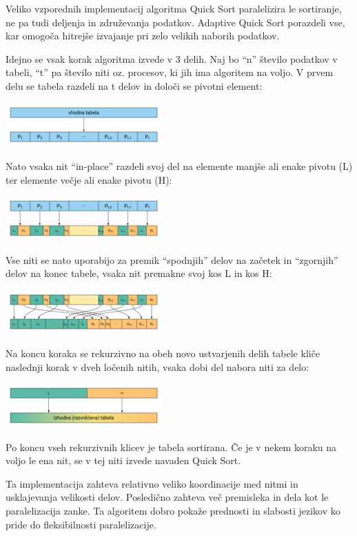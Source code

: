 \documentclass[journal,a4paper,twoside]{sty/IEEEtran}
\begin{document}
Veliko vzporednih implementacij algoritma Quick Sort paralelizira le sortiranje, ne pa tudi deljenja in združevanja podatkov.
Adaptive Quick Sort porazdeli vse, kar omogoča hitrejše izvajanje pri zelo velikih naborih podatkov.

Idejno se vsak korak algoritma izvede v 3 delih.
Naj bo “n” število podatkov v tabeli, “t” pa število niti oz. procesov, ki jih ima algoritem na voljo.
V prvem delu se tabela razdeli na t delov in določi se pivotni element:

\includegraphics[width=0.45\textwidth]{aqs_diag_1}

Nato vsaka nit “in-place” razdeli svoj del na elemente manjše ali enake pivotu (L) ter elemente večje ali enake pivotu (H):

\includegraphics[width=0.45\textwidth]{aqs_diag_2}

Vse niti se nato uporabijo za premik “spodnjih” delov na začetek in “zgornjih” delov na konec tabele, vsaka nit premakne svoj kos L in kos H:

\includegraphics[width=0.45\textwidth]{aqs_diag_3}

Na koncu koraka se rekurzivno na obeh novo ustvarjenih delih tabele kliče naslednji korak v dveh ločenih nitih, vsaka dobi del nabora niti za delo:

\includegraphics[width=0.45\textwidth]{aqs_diag_4}

Po koncu vseh rekurzivnih klicev je tabela sortirana.
Če je v nekem koraku na voljo le ena nit, se v tej niti izvede navaden Quick Sort.

Ta implementacija zahteva relativno veliko koordinacije med nitmi in usklajevanja velikosti delov.
Posledično zahteva več premisleka in dela kot le paralelizacija zanke.
Ta algoritem dobro pokaže prednosti in slabosti jezikov ko pride do fleksibilnosti paralelizacije.
\end{document}
